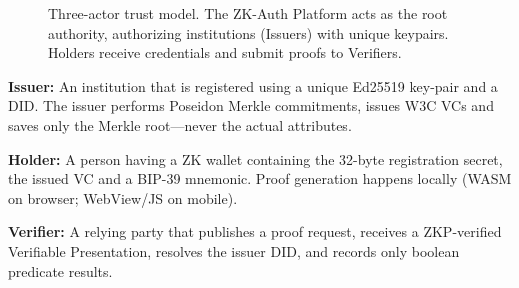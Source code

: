\documentclass[journal,twoside,10pt]{IEEEtran}
\begin{document}
\begin{figure}[!t]
\centering
{}
\caption{Three-actor trust model. The ZK-Auth Platform acts as the root authority, authorizing institutions (Issuers) with unique keypairs. Holders receive credentials and submit proofs to Verifiers.}
\label{fig:trust_model}
\end{figure}

\textbf{Issuer:} An institution that is registered using a unique Ed25519 key-pair and a DID. The issuer performs Poseidon Merkle commitments, issues W3C VCs and saves only the Merkle root---never the actual attributes.

\textbf{Holder:} A person having a ZK wallet containing the 32-byte registration secret, the issued VC and a BIP-39 mnemonic. Proof generation happens locally (WASM on browser; WebView/JS on mobile).

\textbf{Verifier:} A relying party that publishes a proof request, receives
a ZKP-verified Verifiable Presentation, resolves the issuer DID, and records
only boolean predicate results.
\end{document}

